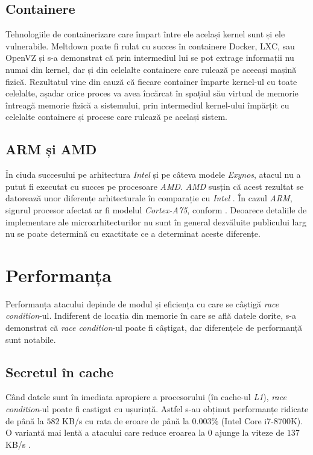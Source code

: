 \subsection{Containere}

Tehnologiile de containerizare care împart între ele același kernel sunt și ele
vulnerabile. Meltdown poate fi rulat cu succes în containere Docker, LXC, sau
OpenVZ și s-a demonstrat că prin intermediul lui se pot extrage informații nu
numai din kernel, dar și din celelalte containere care rulează pe aceeași
mașină fizică. Rezultatul vine din cauză că fiecare container împarte kernel-ul
cu toate celelalte, așadar orice proces va avea încărcat în spațiul său virtual
de memorie întreagă memorie fizică a sistemului, prin intermediul kernel-ului
împărțit cu celelalte containere și procese care rulează pe același sistem.

\subsection{ARM și AMD}

În ciuda succesului pe arhitectura \emph{Intel} și pe câteva modele
\emph{Exynos}, atacul nu a putut fi executat cu succes pe procesoare
\emph{AMD}. \emph{AMD} susțin că acest rezultat se datorează unor diferențe
arhitecturale în comparație cu \emph{Intel} \cite{amd_response}. În cazul
\emph{ARM}, signrul procesor afectat ar fi modelul \emph{Cortex-A75}, conform
\cite{grisenthwaite2018cache}. Deoarece detaliile de implementare ale
microarhitecturilor nu sunt în general dezvăluite publicului larg nu se poate
determină cu exactitate ce a determinat aceste diferențe.

\section{Performanța}

Performanța atacului depinde de modul și eficiența cu care se câștigă
\emph{race condition}-ul. Indiferent de locația din memorie în care se află
datele dorite, s-a demonstrat că \emph{race condition}-ul poate fi câștigat,
dar diferențele de performanță sunt notabile.

\subsection{Secretul în cache}

Când datele sunt în imediata apropiere a procesorului (în cache-ul \emph{L1}),
\emph{race condition}-ul poate fi castigat cu ușurință. Astfel s-au obținut
performanțe ridicate de până la $582$ KB/s cu rata de eroare de până la
$0.003\%$ (Intel Core i7-8700K). O variantă mai lentă a atacului care reduce
eroarea la $0$ ajunge la viteze de $137$ KB/s \cite{meltdown2018}. 

